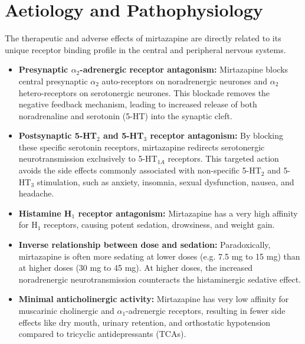 \section*{Aetiology and Pathophysiology}
The therapeutic and adverse effects of mirtazapine are directly related to its unique receptor binding profile in the central and peripheral nervous systems.
\begin{itemize}
    \item \textbf{Presynaptic $\alpha_2$-adrenergic receptor antagonism:} Mirtazapine blocks central presynaptic $\alpha_2$ auto-receptors on noradrenergic neurones and $\alpha_2$ hetero-receptors on serotonergic neurones. This blockade removes the negative feedback mechanism, leading to increased release of both noradrenaline and serotonin (5-HT) into the synaptic cleft.
    \item \textbf{Postsynaptic 5-HT$_2$ and 5-HT$_3$ receptor antagonism:} By blocking these specific serotonin receptors, mirtazapine redirects serotonergic neurotransmission exclusively to 5-HT$_{1A}$ receptors. This targeted action avoids the side effects commonly associated with non-specific 5-HT$_2$ and 5-HT$_3$ stimulation, such as anxiety, insomnia, sexual dysfunction, nausea, and headache.
    \item \textbf{Histamine H$_1$ receptor antagonism:} Mirtazapine has a very high affinity for H$_1$ receptors, causing potent sedation, drowsiness, and weight gain.
    \item \textbf{Inverse relationship between dose and sedation:} Paradoxically, mirtazapine is often more sedating at lower doses (e.g. 7.5 mg to 15 mg) than at higher doses (30 mg to 45 mg). At higher doses, the increased noradrenergic neurotransmission counteracts the histaminergic sedative effect.
    \item \textbf{Minimal anticholinergic activity:} Mirtazapine has very low affinity for muscarinic cholinergic and $\alpha_1$-adrenergic receptors, resulting in fewer side effects like dry mouth, urinary retention, and orthostatic hypotension compared to tricyclic antidepressants (TCAs).
\end{itemize}

